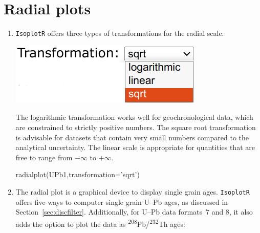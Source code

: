 \begin{refsection}
\begin{enumerate}
\end{enumerate}

\section{Radial plots}
\label{sec:UPbRadial}

\begin{enumerate}

\item \texttt{IsoplotR} offers three types of transformations for the
  radial scale.
  
\noindent\begin{minipage}[t]{.3\linewidth}
  \strut\vspace*{-\baselineskip}\newline
  \includegraphics[width=\linewidth]{../figures/UPbRadialTransformation.png}
\end{minipage}
\begin{minipage}[t]{.7\linewidth}
The logarithmic transformation works well for geochronological data,
which are constrained to strictly positive numbers. The square root
transformation is advisable for datasets that contain very small
numbers compared to the analytical uncertainty.  The linear scale is
appropriate for quantities that are free to range from $-\infty$ to
$+\infty$.
\end{minipage}

\begin{console}
radialplot(UPb1,transformation='sqrt')
\end{console}

\item The radial plot is a graphical device to display single grain
  ages. \texttt{IsoplotR} offers five ways to computer single grain
  U--Pb ages, as discussed in
  Section~\ref{sec:discfilter}. Additionally, for U--Pb data formats~7
  and 8, it also adds the option to plot the data as
  \textsuperscript{208}Pb/\textsuperscript{232}Th ages:


\end{enumerate}
\end{refsection}
